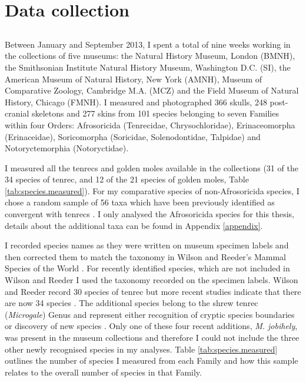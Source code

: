 \section{Data collection}
\label{sect:datacollection}


\subsection{}

	Between January and September 2013, I spent a total of nine weeks working in the collections of five museums: the Natural History Museum, London (BMNH), the Smithsonian Institute Natural History Museum, Washington D.C. (SI), the American Museum of Natural History, New York (AMNH), Museum of Comparative Zoology, Cambridge M.A. (MCZ) and the Field Museum of Natural History, Chicago (FMNH). I measured and photographed 366 skulls, 248 post-cranial skeletons and 277 skins from 101 species belonging to seven Families within four Orders: Afrosoricida (Tenrecidae, Chrysochloridae), Erinaceomorpha (Erinaceidae), Soricomorpha (Soricidae, Solenodontidae, Talpidae) and Notoryctemorphia (Notoryctidae). 

	I measured all the tenrecs and golden moles available in the collections (31 of the 34 species of tenrec, and 12 of the 21 species of golden moles, Table \ref{tab:species.measured}). 
	For my comparative species of non-Afrosoricida species, I chose a random sample of 56 taxa which have been previously identified as convergent with tenrecs \citep[e.g.][]{Gould1966, Symonds2005, Poux2008, Olson2013}. I only analysed the Afrosoricida species for this thesis, details about the additional taxa can be found in Appendix \ref{appendix}.
	
	I recorded species names as they were written on museum specimen labels and then corrected them to match the taxonomy in Wilson and Reeder's Mammal Species of the World \citeyearpar{Wilson2005}. For recently identified species,  which are not included in Wilson and Reeder \citeyearpar{Wilson2005} I used the taxonomy recorded on the specimen labels. Wilson and Reeder \citeyearpar{Wilson2005} record 30 species of tenrec but more recent studies indicate that there are now 34 species \citep[][Table \ref{tab:species.measured}]{Olson2013}. The additional species belong to the shrew tenrec (\textit{Microgale}) Genus and represent either recognition of cryptic species boundaries \citep{Olson2004} or discovery of new species \citep{Goodman2006, Olson2009}. Only one of these four recent additions, \textit{M. jobihely}, was present in the museum collections and therefore I could not include the three other newly recognised species in my analyses. Table \ref{tab:species.measured} outlines the number of species I measured from each Family and how this sample relates to the overall number of species in that Family.

